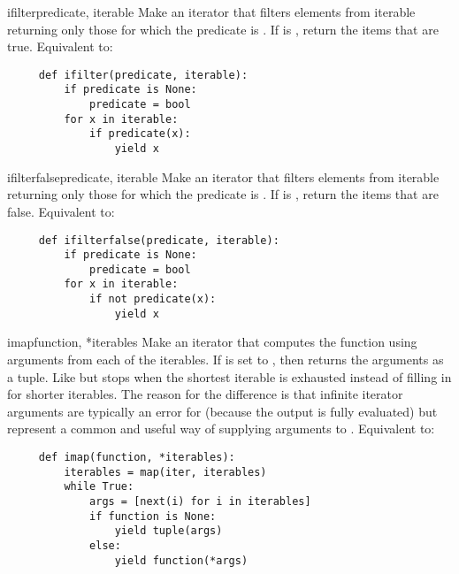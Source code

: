 \begin{funcdesc}{ifilter}{predicate, iterable}
  Make an iterator that filters elements from iterable returning only
  those for which the predicate is .
  If  is , return the items that are true.
  Equivalent to:

  \begin{verbatim}
     def ifilter(predicate, iterable):
         if predicate is None:
             predicate = bool
         for x in iterable:
             if predicate(x):
                 yield x
  \end{verbatim}
\end{funcdesc}

\begin{funcdesc}{ifilterfalse}{predicate, iterable}
  Make an iterator that filters elements from iterable returning only
  those for which the predicate is .
  If  is , return the items that are false.
  Equivalent to:

  \begin{verbatim}
     def ifilterfalse(predicate, iterable):
         if predicate is None:
             predicate = bool
         for x in iterable:
             if not predicate(x):
                 yield x
  \end{verbatim}
\end{funcdesc}

\begin{funcdesc}{imap}{function, *iterables}
  Make an iterator that computes the function using arguments from
  each of the iterables.  If  is set to , then
   returns the arguments as a tuple.  Like
   but stops when the shortest iterable is exhausted
  instead of filling in  for shorter iterables.  The reason
  for the difference is that infinite iterator arguments are typically
  an error for  (because the output is fully evaluated)
  but represent a common and useful way of supplying arguments to
  .
  Equivalent to:

  \begin{verbatim}
     def imap(function, *iterables):
         iterables = map(iter, iterables)
         while True:
             args = [next(i) for i in iterables]
             if function is None:
                 yield tuple(args)
             else:
                 yield function(*args)
  \end{verbatim}
\end{funcdesc}

